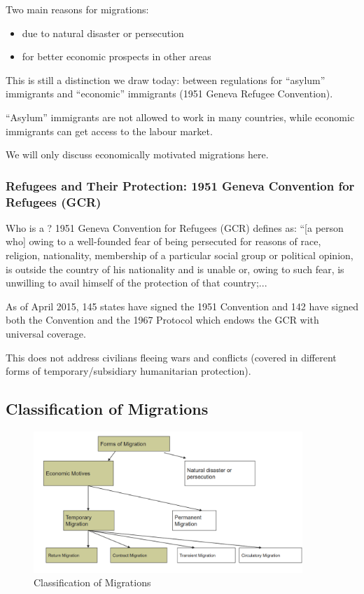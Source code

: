             Two main reasons for migrations:
            \begin{itemize}
                \item {} due to natural disaster or persecution
                \item {} for better economic prospects in other areas
            \end{itemize}
            
            This is still a distinction we draw today: between regulations for “asylum” immigrants and “economic” immigrants (1951 Geneva Refugee Convention).
            
            “Asylum” immigrants are not allowed to work in many countries, while economic immigrants can get access to the labour market.
            
            We will only discuss economically motivated migrations here.

        \subsubsection{Refugees and Their Protection: 1951 Geneva Convention for Refugees (GCR)}

            Who is a ? 1951 Geneva Convention for Refugees (GCR) defines as: “[a person who] owing to a well-founded fear of being persecuted for reasons of race, religion, nationality, membership of a particular social group or political opinion, is outside the country of his nationality and is unable or, owing to such fear, is unwilling to avail himself of the protection of that country;...
            
            As of April 2015, 145 states have signed the 1951 Convention and 142 have signed both the Convention and the 1967 Protocol which endows the GCR with universal coverage. 
            
            This does not address civilians fleeing wars and conflicts (covered in different forms of temporary/subsidiary humanitarian protection).

    \subsection{Classification of Migrations}

        \begin{figure}[H]
            \centering
            \includegraphics[width=4in]{images/ch11/12.png}
            \caption{Classification of Migrations}
        \end{figure}

